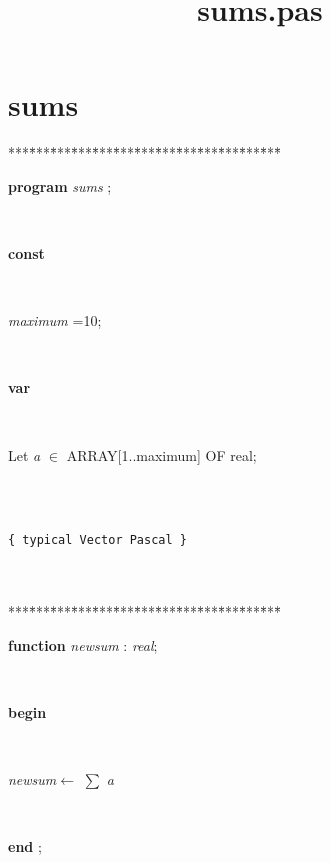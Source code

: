 \documentclass[10pt, a4paper]{article}
\title{sums.pas}
\begin{document}
\maketitle

\tableofcontents
\section{sums}
\begin{tabbing}
***\=***\=***\=***\=***\=***\=***\=***\=***\=***\=***\=***\=***\=\kill
\parbox{14cm}{\textsf{\textbf{program}  \textit{sums} ;}}\\
\+\parbox{14cm}{\textsf{\textbf{const} }}\\
\parbox{14cm}{\textsf{\textit{maximum} =10;}}\\
\<\parbox{14cm}{\textsf{\textbf{var} }}\\
\parbox{14cm}{\textsf{Let \textit{a} $\in$ ARRAY[1..maximum] OF real;}}\\
\\
\parbox{14cm}{\texttt{\small{\{ typical Vector Pascal \}}}}\\
\\
***\=***\=***\=***\=***\=***\=***\=***\=***\=***\=***\=***\=***\=\kill
\parbox{14cm}{\textsf {\textbf {function } \textsf{\textit{newsum} : \textit{real}}; }}\\
\+\parbox{14cm}{\textsf{\textbf{begin} }}\\
\parbox{14cm}{\textsf{\textit{newsum}$\leftarrow$  $\sum$  \textit{a} }}\\
\<\-\parbox{14cm}{\textsf{\textbf{end} ;}}\\


\end{tabbing}
\end{document}
